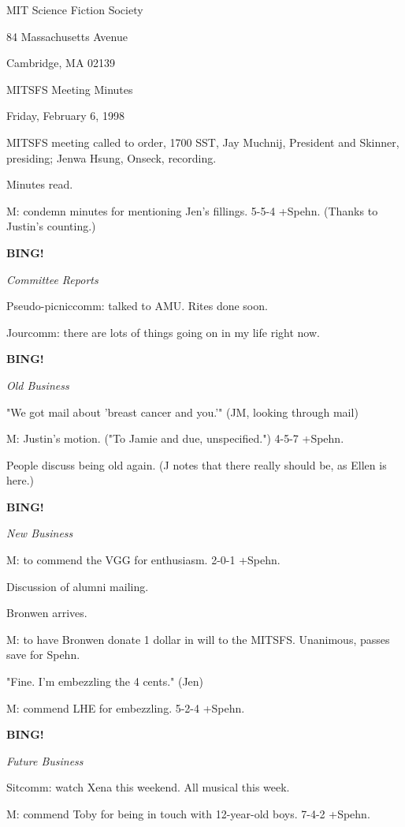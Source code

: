 \documentclass[12pt]{article}
\newcommand{\bing}{{\bf BING!} }
\newcommand{\goto}[1]{\bing \vskip 12pt \centerline{{\em{#1}}}}
\begin{document}
\begin{center}

MIT Science Fiction Society 

84 Massachusetts Avenue

Cambridge, MA 02139

\vspace{12pt}

MITSFS Meeting Minutes 

Friday, February 6, 1998

\end{center}
 
\vspace{18pt}

\setlength{\parskip}{6pt}

\noindent
MITSFS meeting called to order, 1700 SST,
Jay Muchnij, President and Skinner, presiding; Jenwa Hsung, Onseck, recording.

Minutes read.

M: condemn minutes for mentioning Jen's fillings. 5-5-4 +Spehn. (Thanks to Justin's counting.)

\goto{Committee Reports}

Pseudo-picniccomm: talked to AMU. Rites done soon.

Jourcomm: there are lots of things going on in my life right now.

\goto{Old Business}

"We got mail about 'breast cancer and you.'" (JM, looking through mail)

M: Justin's motion. ("To Jamie and due, unspecified.") 4-5-7 +Spehn.

People discuss being old again. (J notes that there really should be, as Ellen is here.)

\goto{New Business}

M: to commend the VGG for enthusiasm. 2-0-1 +Spehn.

Discussion of alumni mailing.

Bronwen arrives.

M: to have Bronwen donate 1 dollar in will to the MITSFS. Unanimous, passes save for Spehn.

"Fine. I'm embezzling the 4 cents." (Jen)

M: commend LHE for embezzling. 5-2-4 +Spehn.

\goto{Future Business}

Sitcomm: watch Xena this weekend. All musical this week.

M: commend Toby for being in touch with 12-year-old boys. 7-4-2 +Spehn.
\end{document}
